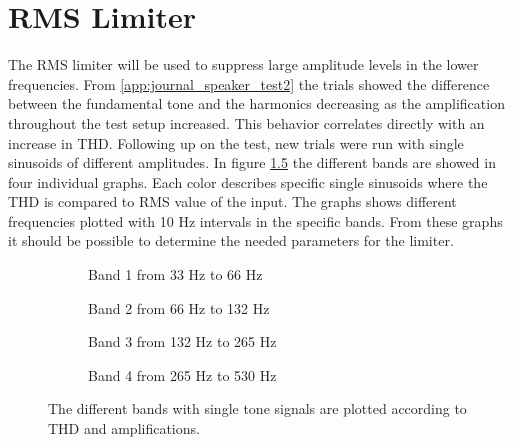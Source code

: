 \chapter{RMS Limiter}\label{cha:CompressorDesign}
The RMS limiter will be used to suppress large amplitude levels in the lower frequencies. From \autoref{app:journal_speaker_test2} the trials showed the difference between the fundamental tone and the harmonics decreasing as the amplification throughout the test setup increased. This behavior correlates directly with an increase in THD. Following up on the test, new trials were run with single sinusoids of different amplitudes. In figure \ref{fig:THDComparissonRMS} the different bands are showed in four individual graphs. Each color describes specific single sinusoids where the THD is compared to RMS value of the input. The graphs shows different frequencies plotted with 10 Hz intervals in the specific bands. From these graphs it should be possible to determine the needed parameters for the limiter.

\begin{figure}[H]
	\centering
	\begin{subfigure}[t]{0.45\textwidth}
		\centering
		
		\caption{Band 1 from 33 Hz to 66 Hz}
		\label{fig:Band1ModelRMS}
	\end{subfigure}
	\begin{subfigure}[t]{0.45\textwidth}
		\centering
		
		\caption{Band 2 from 66 Hz to 132 Hz}
		\label{fig:Band2ModelRMS}
	\end{subfigure}
	\begin{subfigure}[t]{0.45\textwidth}
		\centering
		
		\caption{Band 3 from 132 Hz to 265 Hz}
		\label{fig:Band3ModelRMS}
	\end{subfigure}
	\begin{subfigure}[t]{0.45\textwidth}
		\centering
		
		\caption{Band 4 from 265 Hz to 530 Hz}
		\label{fig:Band4ModelRMS}
	\end{subfigure}
	\caption{The different bands with single tone signals are plotted according to THD and amplifications.}
	\label{fig:THDComparissonRMS}
\end{figure} 

